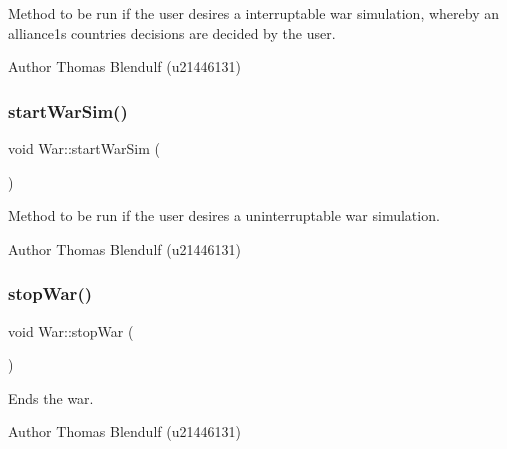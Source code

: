 Method to be run if the user desires a interruptable war simulation, whereby an alliance1\textquotesingle{}s countries decisions are decided by the user. 

\begin{DoxyAuthor}{Author}
Thomas Blendulf (u21446131) 
\end{DoxyAuthor}
\mbox{\label{class_war_ae7095b60438fa57d9238ddd6b895956c}} 
\subsubsection{\texorpdfstring{startWarSim()}{startWarSim()}}
{\footnotesize\ttfamily void War\+::start\+War\+Sim (\begin{DoxyParamCaption}{ }\end{DoxyParamCaption})}



Method to be run if the user desires a uninterruptable war simulation. 

\begin{DoxyAuthor}{Author}
Thomas Blendulf (u21446131) 
\end{DoxyAuthor}
\mbox{\label{class_war_a9bf0fb4d3a5d04c6911799fb5044637c}} 
\subsubsection{\texorpdfstring{stopWar()}{stopWar()}}
{\footnotesize\ttfamily void War\+::stop\+War (\begin{DoxyParamCaption}{ }\end{DoxyParamCaption})}



Ends the war. 

\begin{DoxyAuthor}{Author}
Thomas Blendulf (u21446131) 
\end{DoxyAuthor}
